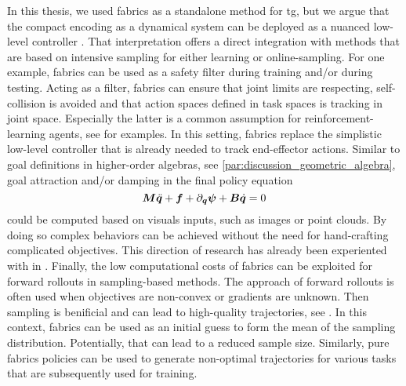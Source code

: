 In this thesis, we used \ac{fabrics} as a standalone method for \ac{tg}, but we
argue that the compact encoding as a dynamical system can be deployed as a
nuanced low-level controller \cite{ratliff2023fabrics,vanwyk2024geometric}.
That interpretation offers a direct integration with methods that are based on 
intensive sampling for either learning or online-sampling.
For one
example, \ac{fabrics} can be used as a safety filter during training and/or
during testing. Acting as a filter, \ac{fabrics} can ensure that joint limits
are respecting, self-collision is avoided and that action spaces defined in task
spaces is tracking in joint space. Especially the latter is a common assumption
for reinforcement-learning agents, see
\cite{hansen2020self,hansen2021generalization} for examples. In this setting,
\ac{fabrics} replace the simplistic low-level controller that is already
needed to track end-effector actions.
Similar to goal definitions in higher-order algebras, see
\cref{par:discussion_geometric_algebra}, goal attraction and/or damping in the final
policy equation 
\[
  \bm{M}\ddot{\bm{q}} + \bm{f} + \partial_{\bm{q}}\bm{\psi} + \bm{B}\dot{\bm{q}} = 0
\]
could be computed based on visuals inputs, such as images or point clouds. By
doing so complex behaviors can be achieved without the need for hand-crafting
complicated objectives. This direction of research has already been experiented
with in \cite{vanwyk2024geometric}.
Finally, the low computational costs of \ac{fabrics} can be exploited for
forward rollouts in sampling-based methods. The approach of forward rollouts is
often used when objectives are non-convex or gradients are unknown. Then
sampling is benificial and can lead to high-quality trajectories, see
\cite{Pezzato2023sampling}. In this context, \ac{fabrics} can be used as an
initial guess to form the mean of the sampling distribution. Potentially, that
can lead to a reduced sample size. Similarly, pure \ac{fabrics} policies can be
used to generate non-optimal trajectories for various tasks that are
subsequently used for training.

  




